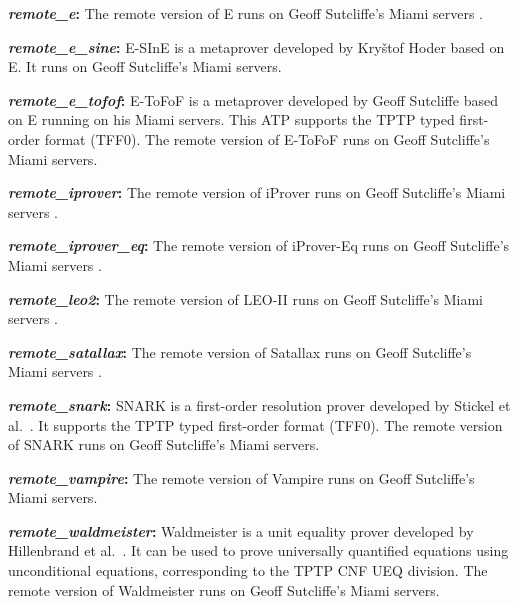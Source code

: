\documentclass[a4paper,12pt]{article}
\begin{document}
\begin{enum}
\begin{enum}
\item[\labelitemi] \textbf{\textit{remote\_e}:} The remote version of E runs
on Geoff Sutcliffe's Miami servers \cite{sutcliffe-2000}.

\item[\labelitemi] \textbf{\textit{remote\_e\_sine}:} E-SInE is a metaprover
developed by Kry\v stof Hoder \cite{sine} based on E. It runs on Geoff
Sutcliffe's Miami servers.

\item[\labelitemi] \textbf{\textit{remote\_e\_tofof}:} E-ToFoF is a metaprover
developed by Geoff Sutcliffe \cite{tofof} based on E running on his Miami
servers. This ATP supports the TPTP typed first-order format (TFF0). The
remote version of E-ToFoF runs on Geoff Sutcliffe's Miami servers.

\item[\labelitemi] \textbf{\textit{remote\_iprover}:} The
remote version of iProver runs on Geoff Sutcliffe's Miami servers
\cite{sutcliffe-2000}.

\item[\labelitemi] \textbf{\textit{remote\_iprover\_eq}:} The
remote version of iProver-Eq runs on Geoff Sutcliffe's Miami servers
\cite{sutcliffe-2000}.

\item[\labelitemi] \textbf{\textit{remote\_leo2}:} The remote version of LEO-II
runs on Geoff Sutcliffe's Miami servers \cite{sutcliffe-2000}.

\item[\labelitemi] \textbf{\textit{remote\_satallax}:} The remote version of
Satallax runs on Geoff Sutcliffe's Miami servers \cite{sutcliffe-2000}.

\item[\labelitemi] \textbf{\textit{remote\_snark}:} SNARK is a first-order
resolution prover developed by Stickel et al.\ \cite{snark}. It supports the
TPTP typed first-order format (TFF0). The remote version of SNARK runs on
Geoff Sutcliffe's Miami servers.

\item[\labelitemi] \textbf{\textit{remote\_vampire}:} The remote version of
Vampire runs on Geoff Sutcliffe's Miami servers.

\item[\labelitemi] \textbf{\textit{remote\_waldmeister}:} Waldmeister is a unit
equality prover developed by Hillenbrand et al.\ \cite{waldmeister}. It can be
used to prove universally quantified equations using unconditional equations,
corresponding to the TPTP CNF UEQ division. The remote version of Waldmeister
runs on Geoff Sutcliffe's Miami servers.


\end{enum}
\end{enum}
\end{document}
